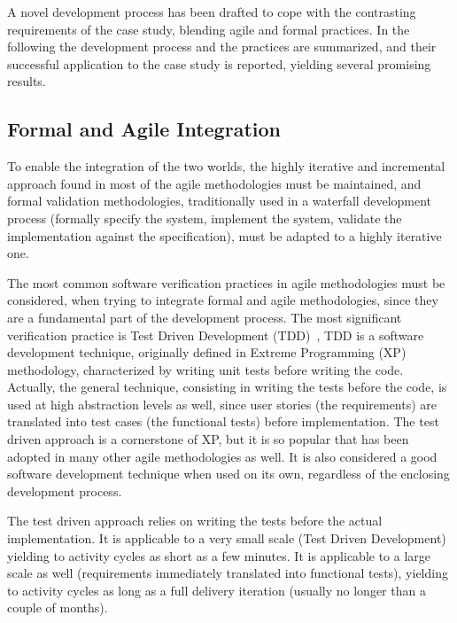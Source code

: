 \documentclass{article}
\begin{document}
A novel development process has been drafted to cope with the contrasting requirements of the case study, blending agile and formal practices.  
In the following the development process and the practices are summarized, and their successful application to the case study is reported, yielding several promising results.



\subsection{Formal and Agile Integration}
\label{subsec:formal_and_agile_integration}

To enable the integration of the two worlds, the highly iterative and incremental approach found in most of the agile methodologies must be maintained, and formal validation methodologies, traditionally used in a waterfall development process (formally specify the system, implement the system, validate the implementation against the specification), must be adapted to a highly iterative one.

The most common software verification practices in agile methodologies must be considered, when trying to integrate formal and agile methodologies, since they are a fundamental part of the development process. 
The most significant verification practice is Test Driven Development (TDD)~\cite{Beck2003}, TDD is a software development technique, originally defined in Extreme Programming (XP)~\cite{Beck2004} methodology, characterized by writing unit tests before writing the code.
Actually, the general technique, consisting in writing the tests before the code, is used at high abstraction levels as well, since user stories (the requirements) are translated into test cases (the functional tests) before implementation.
The test driven approach is a cornerstone of XP, but it is so popular that has been adopted in many other agile methodologies as well.
It is also considered a good software development technique when used on its own, regardless of the enclosing development process.

The test driven approach relies on writing the tests before the actual implementation. 
It is applicable to a very small scale (Test Driven Development) yielding to activity cycles as short as a few minutes.
It is applicable to a large scale as well (requirements immediately translated into functional tests), yielding to activity cycles as long as a full delivery iteration (usually no longer than a couple of months).
\end{document}
